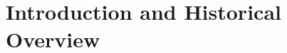 \documentclass[degn-notes.tex]{subfiles}
\begin{document}
\setcounter{chapter}{0}

\chapter{Introduction and Historical Overview}
\end{document}
